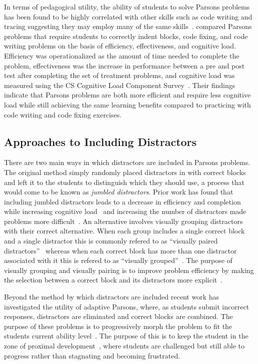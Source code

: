 \documentclass[authorversion,nonacm]{acmart}
\begin{document}
In terms of pedagogical utility, the ability of students to solve Parsons
problems has been found to be highly correlated with other skills such as code
writing and tracing suggesting they may employ many of the same
skills~\cite{whalley2007many, lopez2008relationships, venables2009closer,
fowler2022reevaluating}.  \citet{ericson2017solving} compared Parsons problems
that require students to correctly indent blocks, code fixing, and code writing
problems on the basis of efficiency, effectiveness, and cognitive load.
Efficiency was operationalized as the amount of time needed to complete the
problem, effectiveness was the increase in performance between a pre and post
test after completing the set of treatment problems, and cognitive load was
measured using the CS Cognitive Load Component
Survey~\cite{morrison2014measuring}. Their findings indicate that Parsons
problems are both more efficient and require less cognitive load while still
achieving the same learning benefits compared to practicing with code writing
and code fixing exercises.

\subsection{Approaches to Including Distractors}

There are two main ways in which distractors are included in Parsons problems.
The original method simply randomly placed distractors in with correct blocks
and left it to the students to distinguish which they should use, a process 
that would come to be known as \textit{jumbled distractors}.
Prior work has found that including jumbled distractors leads to a decrease in
efficiency and completion while increasing cognitive
load~\cite{garner2007exploration, harms2016distractors} and increasing the
number of distractors made problems more difficult~\cite{ericson2015analysis}.
An alternative involves visually grouping distractors with their correct alternative.
When each group includes a single correct block and a single distractor this is commonly
refered to as ``visually paired distractors''~\cite{} whereas when each correct block
has more than one distractor associated with it this is refered to as
``visually grouped''~\cite{}.  The purpose of visually grouping and visually pairing
is to improve problem efficiency by making the selection between a correct block 
and its distractors more explicit~\cite{denny2008evaluating}.

Beyond the method by which distractors are included 
recent work has investigated the utility of adaptive Parsons, where, 
as students submit incorrect responses, distractors are eliminated and correct
blocks are combined. The purpose of these problems is to progressively morph
the problem to fit the students current ability
level~\cite{ericson2016dynamically, ericson2019investigating}. The purpose of
this is to keep the student in the zone of proximal
development~\cite{vygotsky1978mind}, where students are challenged but still
able to progress rather than stagnating and becoming frustrated. 
\end{document}

